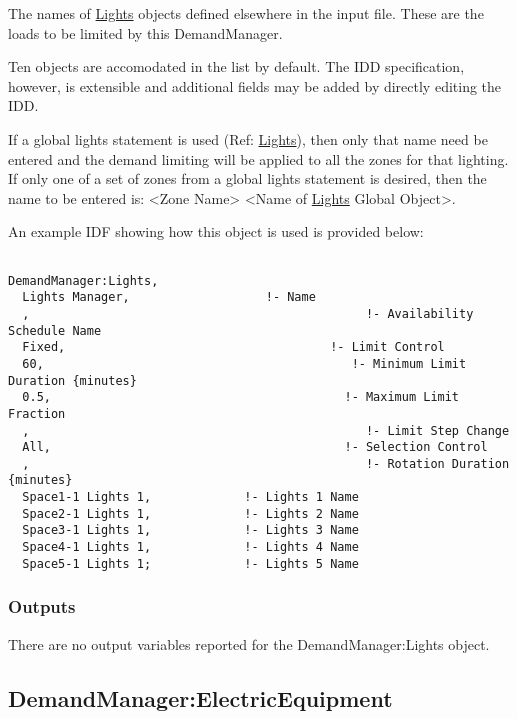 The names of \hyperref[lights-000]{Lights} objects defined elsewhere in the input file. These are the loads to be limited by this DemandManager.

Ten objects are accomodated in the list by default. The IDD specification, however, is extensible and additional fields may be added by directly editing the IDD.

If a global lights statement is used (Ref: \hyperref[lights-000]{Lights}), then only that name need be entered and the demand limiting will be applied to all the zones for that lighting. If only one of a set of zones from a global lights statement is desired, then the name to be entered is: \textless{}Zone Name\textgreater{} \textless{}Name of \hyperref[lights-000]{Lights} Global Object\textgreater{}.

An example IDF showing how this object is used is provided below:

\begin{lstlisting}

DemandManager:Lights,
  Lights Manager,                   !- Name
  ,                                               !- Availability Schedule Name
  Fixed,                                     !- Limit Control
  60,                                           !- Minimum Limit Duration {minutes}
  0.5,                                         !- Maximum Limit Fraction
  ,                                               !- Limit Step Change
  All,                                         !- Selection Control
  ,                                               !- Rotation Duration {minutes}
  Space1-1 Lights 1,             !- Lights 1 Name
  Space2-1 Lights 1,             !- Lights 2 Name
  Space3-1 Lights 1,             !- Lights 3 Name
  Space4-1 Lights 1,             !- Lights 4 Name
  Space5-1 Lights 1;             !- Lights 5 Name
\end{lstlisting}

\subsubsection{Outputs}\label{outputs-2-005}

There are no output variables reported for the DemandManager:Lights object.

\subsection{DemandManager:ElectricEquipment}\label{demandmanagerelectricequipment}

